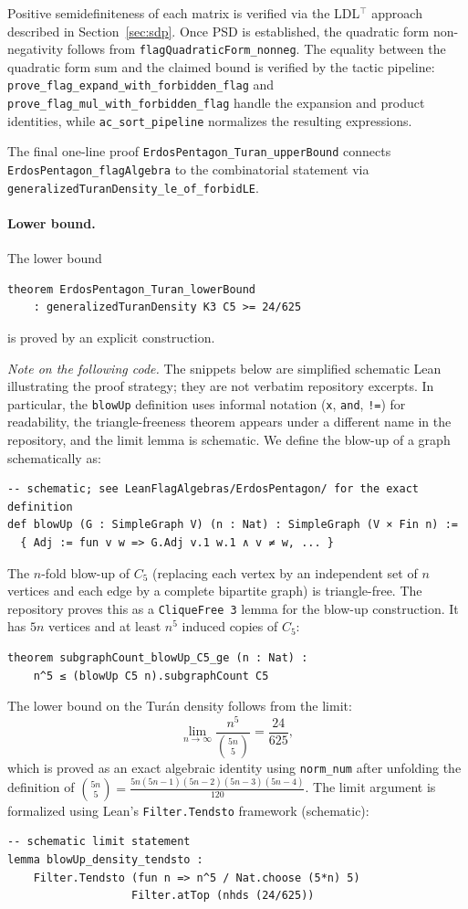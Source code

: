 \documentclass{article}
\newcommand{\lean}[1]{\texttt{#1}}
\begin{document}
Positive semidefiniteness of each matrix is verified via the LDL$^\top$
approach described in Section~\ref{sec:sdp}.  Once PSD is established, the
quadratic form non-negativity follows from
\lean{flagQuadraticForm\_nonneg}.  The equality between the quadratic form
sum and the claimed bound is verified by the tactic pipeline:
\lean{prove\_flag\_expand\_with\_forbidden\_flag} and
\lean{prove\_flag\_mul\_with\_forbidden\_flag} handle the expansion and
product identities, while \lean{ac\_sort\_pipeline} normalizes the resulting
expressions.

The final one-line proof \lean{ErdosPentagon\_Turan\_upperBound} connects
\lean{ErdosPentagon\_flagAlgebra} to the combinatorial statement via
\lean{generalizedTuranDensity\_le\_of\_forbidLE}.

\paragraph{Lower bound.}
The lower bound
\begin{lstlisting}
theorem ErdosPentagon_Turan_lowerBound
    : generalizedTuranDensity K3 C5 >= 24/625
\end{lstlisting}
is proved by an explicit construction.

\emph{Note on the following code.}  The snippets below are simplified
schematic Lean illustrating the proof strategy; they are not verbatim
repository excerpts.  In particular, the \lean{blowUp} definition uses
informal notation (\lean{x}, \lean{and}, \lean{!=}) for readability, the
triangle-freeness theorem appears under a different name in the repository,
and the limit lemma is schematic.  We define the blow-up of a graph
schematically as:
\begin{lstlisting}
-- schematic; see LeanFlagAlgebras/ErdosPentagon/ for the exact definition
def blowUp (G : SimpleGraph V) (n : Nat) : SimpleGraph (V × Fin n) :=
  { Adj := fun v w => G.Adj v.1 w.1 ∧ v ≠ w, ... }
\end{lstlisting}
The $n$-fold blow-up of $C_5$ (replacing each vertex by an independent set
of $n$ vertices and each edge by a complete bipartite graph) is triangle-free.
The repository proves this as a \lean{CliqueFree 3} lemma for the blow-up
construction.  It has $5n$ vertices and at least $n^5$ induced copies of $C_5$:
\begin{lstlisting}
theorem subgraphCount_blowUp_C5_ge (n : Nat) :
    n^5 ≤ (blowUp C5 n).subgraphCount C5
\end{lstlisting}
The lower bound on the Turán density follows from the limit:
\[
  \lim_{n\to\infty} \frac{n^5}{\binom{5n}{5}} = \frac{24}{625},
\]
which is proved as an exact algebraic identity using \lean{norm\_num} after
unfolding the definition of $\binom{5n}{5} = \frac{5n(5n-1)(5n-2)(5n-3)(5n-4)}{120}$.
The limit argument is formalized using Lean's \lean{Filter.Tendsto}
framework (schematic):
\begin{lstlisting}
-- schematic limit statement
lemma blowUp_density_tendsto :
    Filter.Tendsto (fun n => n^5 / Nat.choose (5*n) 5)
                   Filter.atTop (nhds (24/625))
\end{lstlisting}
\end{document}
